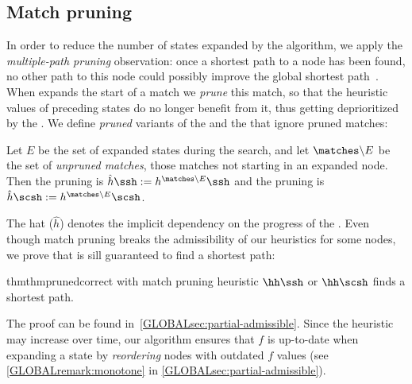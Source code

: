 \subsection{Match pruning} \label{GLOBALsec:match-pruning}

In order to reduce the number of
states expanded by the \A algorithm, we apply the \emph{multiple-path pruning}
observation: once a shortest path to a node has been found, no other path to
this node could possibly improve the global shortest
path~\citep{poole2017artificial}. When \A expands the start of a
match we
\emph{prune} this match, so that the heuristic values of preceding states do no longer
benefit from it, thus getting deprioritized by the
\A. We define \emph{pruned} variants of the \sh and the \csh that ignore
pruned matches:

\begin{definition}
   Let $E$ be the set of expanded states during the \A search, and let $\matches \backslash
   E$ be the set of \emph{unpruned matches}, \ie those matches not starting in an expanded
   node. Then the pruning \sh is $\hat h\ssh := h^{\matches\backslash E}\ssh$ and
   the pruning \csh is ${\hat h\scsh := h^{\matches\backslash E}\scsh}$.
\end{definition}

The hat ($\hat h$) denotes the implicit dependency on the progress of the \A. Even
though match pruning breaks the admissibility of our heuristics for some
nodes, we prove that \A is sill guaranteed to find a shortest path:

\begin{restatable}{thm}{thmprunedcorrect} \label{GLOBALthm:pruned-correct}
   \A with match pruning heuristic $\hh\ssh$ or $\hh\scsh$ finds a shortest path.
\end{restatable}

The proof can be found in~\cref{GLOBALsec:partial-admissible}. Since the heuristic may
increase over time, our algorithm ensures that $f$ is up-to-date when expanding a
state by \emph{reordering} nodes with outdated $f$ values (see \cref{GLOBALremark:monotone} in \cref{GLOBALsec:partial-admissible}).
